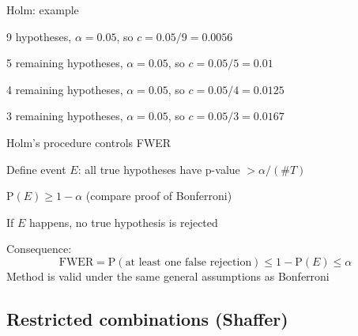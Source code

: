 \begin{frame}{Holm: example}
  \hspace*{-1cm}
  {\footnotesize
  }
  \eb
    \be
      \item 9 hypotheses, $\alpha=0.05$, so $c = 0.05/9 = 0.0056$
      \item<3-> 5 remaining hypotheses, $\alpha=0.05$, so $c = 0.05/5 = 0.01$
      \item<5-> 4 remaining hypotheses, $\alpha=0.05$, so $c = 0.05/4 = 0.0125$
      \item<7> 3 remaining hypotheses, $\alpha=0.05$, so $c = 0.05/3 = 0.0167$
    \ee
  \eb
\end{frame}


\begin{frame}{Holm's procedure controls FWER}
    \bi
      \item Define event $E$: all true hypotheses have p-value $> \alpha/(\#T)$
      \item $\mathrm{P}(E)\geq1-\alpha$ (compare proof of Bonferroni)
      \item If $E$ happens, no true hypothesis is rejected
      \item Consequence:
      \[
      \textrm{FWER} = \mathrm{P}(\textrm{at least one false rejection}) \leq 1-\mathrm{P}(E)\leq\alpha
      \]
    \ei
  \eb
    Method is valid under the same general assumptions as Bonferroni
  \eb
\end{frame}


\subsection{Restricted combinations (Shaffer)}

